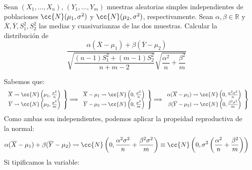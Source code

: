 \begin{ejercicio}
    Sean $(X_1, \ldots, X_n)$, $(Y_1, \ldots, Y_m)$ muestras aleatorias simples independientes de poblaciones $\cc{N}(\mu_1,\sigma^2)$ y $\cc{N}(\mu_2, \sigma^2)$, respectivamente. Sean $\alpha,\beta\in \mathbb{R}$ y $\overline{X},\overline{Y},S_1^2, S_2^2$ las medias y cuasivarianzas de las dos muestras. Calcular la distribución de
    \begin{equation*}
        \dfrac{\alpha\left(\overline{X}-\mu_1\right)+\beta\left(\overline{Y}-\mu_2\right)}{\sqrt{\dfrac{(n-1)S_1^2 + (m-1)S_2^2}{n+m-2}} \sqrt{\dfrac{\alpha^2}{n} + \dfrac{\beta^2}{m}}}
    \end{equation*}

    \noindent
    Sabemos que:
    \begin{equation*}
        \left.\begin{array}{r}
                \overline{X} \rightsquigarrow\cc{N}\left(\mu_1, \frac{\sigma^2}{n}\right) \\
                \overline{Y} \rightsquigarrow\cc{N}\left(\mu_2, \frac{\sigma^2}{m}\right) 
        \end{array}\right\} \Longrightarrow 
        \left.\begin{array}{r}
                \overline{X}-\mu_1 \rightsquigarrow\cc{N}\left(0, \frac{\sigma^2}{n}\right) \\
                \overline{Y}-\mu_2 \rightsquigarrow\cc{N}\left(0, \frac{\sigma^2}{m}\right) 
        \end{array}\right\} \Longrightarrow 
        \left.\begin{array}{r}
                \alpha(\overline{X}-\mu_1 )\rightsquigarrow\cc{N}\left(0, \frac{\alpha^2\sigma^2}{n}\right) \\
                \beta(\overline{Y}-\mu_2 )\rightsquigarrow\cc{N}\left(0, \frac{\beta^2\sigma^2}{m}\right) 
        \end{array}\right\} 
    \end{equation*}
    Como ambas son independientes, podemos aplicar la propeidad reproductiva de la normal:
    \begin{equation*}
        \alpha(\overline{X}-\mu_1 ) +\beta(\overline{Y}-\mu_2 ) \rightsquigarrow \cc{N}\left(0, \dfrac{\alpha^2\sigma^2}{n} + \dfrac{\beta^2\sigma^2}{m}\right) \equiv \cc{N}\left(0, \sigma^2\left(\frac{\alpha^2}{n}+\frac{\beta^2}{m}\right) \right) 
    \end{equation*}
    Si tipificamos la variable:
    \begin{equation*}

\end{equation*}
\end{ejercicio}
